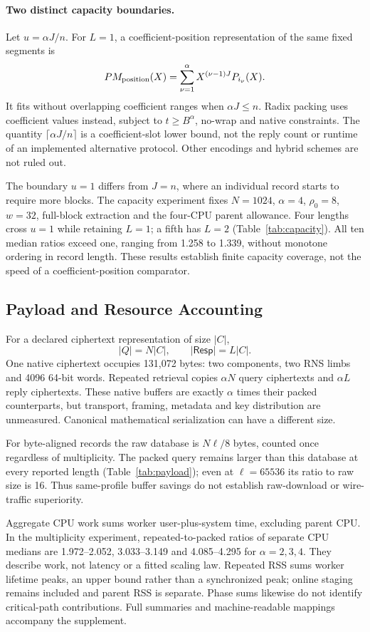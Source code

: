 \paragraph{Two distinct capacity boundaries.}
Let \(u=\alpha J/n\). For \(L=1\), a coefficient-position representation
of the same fixed segments is
\[
 PM_{\rm position}(X)=\sum_{\nu=1}^{\alpha}
 X^{(\nu-1)J}P_{i_\nu}(X).
\]
It fits without overlapping coefficient ranges when \(\alpha J\le n\).
Radix packing uses coefficient values instead, subject to
\(t\ge B^\alpha\), no-wrap and native constraints. The quantity
\(\lceil\alpha J/n\rceil\) is a coefficient-slot lower bound, not the
reply count or runtime of an implemented alternative protocol. Other
encodings and hybrid schemes are not ruled out.

The boundary \(u=1\) differs from \(J=n\), where an individual record
starts to require more blocks. The capacity experiment fixes
\(N=1024\), \(\alpha=4\), \(\rho_0=8\), \(w=32\), full-block extraction
and the four-CPU parent allowance. Four lengths cross \(u=1\) while
retaining \(L=1\); a fifth has \(L=2\) (Table~\ref{tab:capacity}). All ten
median ratios exceed one, ranging from 1.258 to 1.339, without monotone
ordering in record length. These results establish finite capacity
coverage, not the speed of a coefficient-position comparator.


\subsection{Payload and Resource Accounting}
For a declared ciphertext representation of size \(|C|\),
\begin{equation}\label{eq:payload}
 |Q|=N|C|,\qquad |\mathsf{Resp}|=L|C|.
\end{equation}
One native ciphertext occupies 131,072 bytes: two components, two RNS
limbs and 4096 64-bit words. Repeated retrieval copies \(\alpha N\)
query ciphertexts and \(\alpha L\) reply ciphertexts. These native
buffers are exactly \(\alpha\) times their packed counterparts, but
transport, framing, metadata and key distribution are unmeasured.
Canonical mathematical serialization can have a different size.

For byte-aligned records the raw database is \(N\ell/8\) bytes, counted
once regardless of multiplicity. The packed query remains larger than
this database at every reported length (Table~\ref{tab:payload}); even
at \(\ell=65536\) its ratio to raw size is 16. Thus same-profile buffer
savings do not establish raw-download or wire-traffic superiority.


Aggregate CPU work sums worker user-plus-system time, excluding parent
CPU. In the multiplicity experiment, repeated-to-packed ratios of
separate CPU medians are 1.972--2.052, 3.033--3.149 and 4.085--4.295 for
\(\alpha=2,3,4\). They describe work, not latency or a fitted scaling law.
Repeated RSS sums worker lifetime peaks, an upper bound rather than a
synchronized peak; online staging remains included and parent RSS is
separate. Phase sums likewise do not identify critical-path contributions.
Full summaries and machine-readable mappings accompany the supplement.
